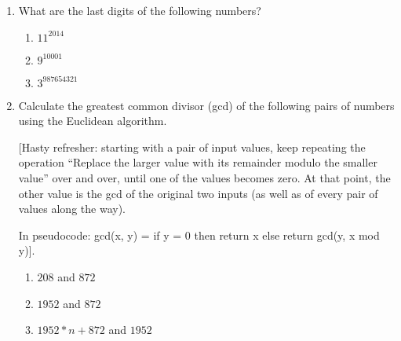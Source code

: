 \documentclass[11pt]{article}
\newif\ifsolutions
\begin{document}
\maketitle

\begin{enumerate}

\item What are the last digits of the following numbers?
\begin{enumerate}
\item $11^{2014}$
\item $9^{10001}$
\item $3^{987654321}$
\end{enumerate}

\ifsolutions
\textbf{Solutions:}
\begin{enumerate}
\item $11$ is always $1$ mod $10$ therefore the answer to (a) is 1.
\item $9$ is its own inverse mod $10$, therefore, if $9$ is raised to an odd power, the number will be $9$ mod $10$. So the answer is $9$
\item $3^4 = 9^2 = 1 $ mod $ 10$. We see that the exponent $987654321 = 1$ mod $4$ so the answer is $3$.
\end{enumerate}
\fi

\item Calculate the greatest common divisor (gcd) of the following pairs of numbers using the Euclidean algorithm.

[Hasty refresher: starting with a pair of input values, keep repeating the operation ``Replace the larger value with its remainder modulo the smaller value'' over and over, until one of the values becomes zero. At that point, the other value is the gcd of the original two inputs (as well as of every pair of values along the way).

In pseudocode: gcd(x, y) = if y = 0 then return x else return gcd(y, x mod y)].

\begin{enumerate}
\item $208$ and $872$
\item $1952$ and $872$
\item $1952*n + 872$ and $1952$
\end{enumerate}

\ifsolutions
\textbf{Solutions:} 8 for all of these. The first answer students should calculate by hand, the second answer will reduce to the first after one step, and the third answer will reduce to the second in one step.  \fi



\end{enumerate}
\end{document}
